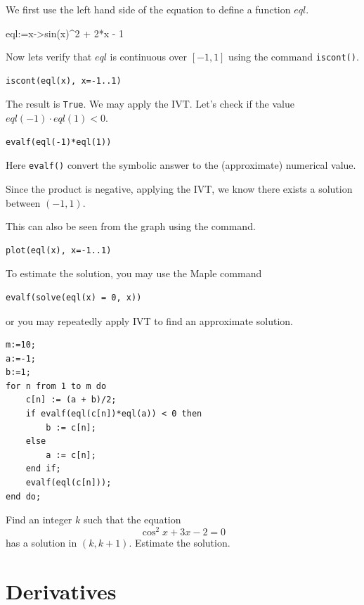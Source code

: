 \documentclass[
  en,11pt,simple]{elegantbook}
\newcommand{\size}[2]{{\fontsize{#1}{0}\selectfont#2}}
\renewenvironment{exercise}[1][]{
    \refstepcounter{exer}
    \par\noindent
    \makebox[-3pt][r]{\color{red!90}\size{12}{\HandPencilLeft}}
	\textbf{\color{main}{\exercisename} \theexer #1}
    \rmfamily
}{\par\ignorespacesafterend}
\begin{document}
\begin{solution}
{}
We first use the left hand side of the equation to define a function \(eql\).

eql:=x-\textgreater sin(x)\^{}2 + 2*x - 1

Now lets verify that \(eql\) is continuous over \([-1,1]\) using the command \texttt{iscont()}.

\begin{verbatim}
iscont(eql(x), x=-1..1)
\end{verbatim}

The result is \texttt{True}. We may apply the IVT. Let's check if the value \(eql(-1)\cdot eql(1)<0\).

\begin{verbatim}
evalf(eql(-1)*eql(1))
\end{verbatim}

Here \texttt{evalf()} convert the symbolic answer to the (approximate) numerical value.

Since the product is negative, applying the IVT, we know there exists a solution between \((-1, 1)\).

This can also be seen from the graph using the command.

\begin{verbatim}
plot(eql(x), x=-1..1)
\end{verbatim}

To estimate the solution, you may use the Maple command

\begin{verbatim}
evalf(solve(eql(x) = 0, x))
\end{verbatim}

or you may repeatedly apply IVT to find an approximate solution.

\begin{verbatim}
m:=10;
a:=-1;
b:=1;
for n from 1 to m do
    c[n] := (a + b)/2;
    if evalf(eql(c[n])*eql(a)) < 0 then
        b := c[n];
    else
        a := c[n];
    end if;
    evalf(eql(c[n]));
end do;
\end{verbatim}
\end{solution}

\begin{exercise}

Find an integer \(k\) such that the equation
\[
\cos^2x + 3x - 2=0
\]
has a solution in \((k, k+1)\). Estimate the solution.
\end{exercise}

\hypertarget{derivatives}{%
\chapter{Derivatives}\label{derivatives}}
\end{document}
